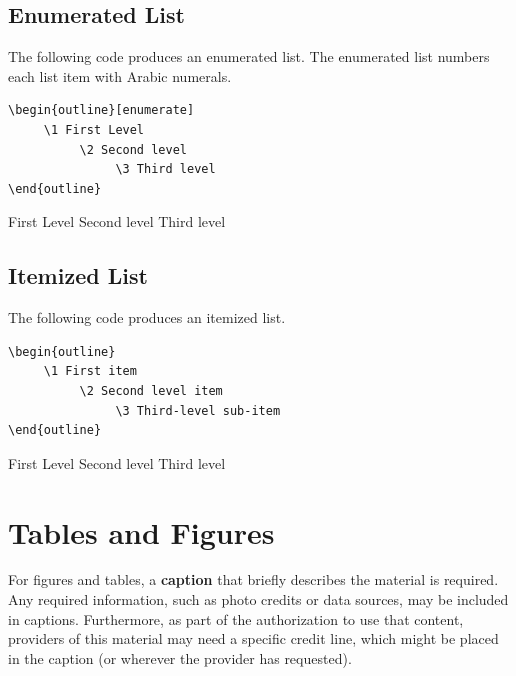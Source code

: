  \subsection{Enumerated List}
 The following code produces an enumerated list.  The enumerated list numbers each list item with Arabic numerals.
 
\begin{verbatim}
\begin{outline}[enumerate]
     \1 First Level
          \2 Second level
               \3 Third level
\end{outline}
 \end{verbatim}
 
 \begin{outline}[enumerate]
 	\1 First Level
		\2 Second level
			\3 Third level
\end{outline}
 

 \subsection{Itemized List}
 The following code produces an itemized list.
 
\begin{verbatim}
\begin{outline}
     \1 First item
          \2 Second level item
               \3 Third-level sub-item
\end{outline}
 \end{verbatim}
 
 \begin{outline}
 	\1 First Level
		\2 Second level
			\3 Third level
\end{outline}



\section{Tables and Figures}

For figures and tables, a \textbf{caption} that briefly describes the material is required.  
Any required information, such as photo credits or data sources, may be included in captions. 
Furthermore, as part of the authorization to use that content, providers of this material may need a specific credit line, which might be placed in the caption (or wherever the provider has requested).  



